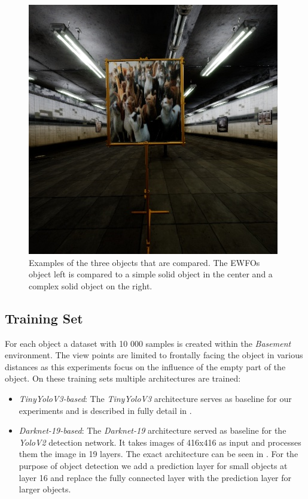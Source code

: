 \begin{figure}[hbtp]
\begin{minipage}{0.3\textwidth}
	\end{minipage}
	\begin{minipage}{0.3\textwidth}
		\includegraphics[width=\textwidth]{fig/cats}
	\end{minipage}
	\caption{Examples of the three objects that are compared. The \acp{EWFO} object left is compared to a simple solid object in the center and a complex solid object on the right.}
	\label{fig:cats}
\end{figure}

\subsection{Training Set}

For each object a dataset with 10 000 samples is created within the \textit{Basement} environment. The view points are limited to frontally facing the object in various distances as this experiments focus on the influence of the empty part of the object. On these training sets multiple architectures are trained: 

\begin{itemize}
	\item \textit{TinyYoloV3-based}: The \textit{TinyYoloV3} architecture serves as baseline for our experiments and is described in fully detail in .
	\item \textit{Darknet-19-based}: The \textit{Darknet-19} architecture served as baseline for the \textit{YoloV2} detection network. It takes images of 416x416 as input and processes them the image in 19 layers. The exact architecture can be seen in . For the purpose of object detection we add a prediction layer for small objects at layer 16 and replace the fully connected layer with the prediction layer for larger objects.
\end{itemize}

